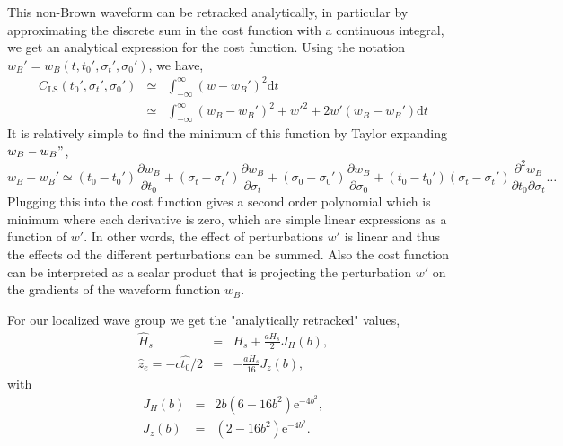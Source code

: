 This non-Brown waveform can be retracked analytically, in particular by approximating the discrete sum in the cost function with a continuous integral, we get an analytical expression for the cost function. Using the notation $w_B'=w_B(t,t_0',\sigma_t',\sigma_0')$, we have, 
\begin{eqnarray}
   C_{\mathrm{LS}}(t_0',\sigma_t',\sigma_0')& \simeq &\int_{-\infty} ^\infty \left( w-w_B'  \right)^2 \mathrm{d} t \\
                  & \simeq & \int_{-\infty} ^\infty \left( w_B-w_B' \right)^2  + w'^2+ 2 w'\left( w_B-w_B' \right)  \mathrm{d} t 
\end{eqnarray} 
It is relatively simple to find the minimum of this function \citep{DeCarlo&al.2023} by Taylor expanding $w_B-w_B"$, 
\begin{equation}
    w_B-w_B' \simeq  (t_0-t_0') \frac{\partial w_B}{\partial t_0} +   (\sigma_t-\sigma_t') \frac{\partial w_B}{\partial \sigma_t} +   (\sigma_0-\sigma_0') \frac{\partial w_B}{\partial \sigma_0} + (t_0-t_0')(\sigma_t-\sigma_t') \frac{\partial^2 w_B}{\partial t_0  \partial \sigma_t}  \dots 
\end{equation}
Plugging this into the cost function gives a second order polynomial which is minimum where each derivative is zero, 
which are simple linear expressions as a function of $w'$. In other words, the effect of perturbations $w'$ is linear and thus the effects od the different perturbations can be summed.  Also the cost function can be interpreted as a scalar product that is projecting the perturbation $w'$ on the gradients of the waveform function $w_B$. 

For our localized wave group we get the "analytically retracked" values, 
 \begin{eqnarray}
    \widehat{H}_{s}&=& H_s +  \frac{a H_s }{2}  J_H(b), \label{eq:Hsfit}\\
    \widehat{z}_e= - c \widehat{t_0} / 2 & =& - \frac{a H_s}{16} J_z(b),\label{eq:epochfit}
\end{eqnarray}
with 
 \begin{eqnarray}
    J_H(b)&=& 2 b \left(6- 16 b^2\right) \mathrm{e}^{-4b^2},\label{eq:JH}\\
    J_z(b)&=&   \left(2-16 b^2\right) \mathrm{e}^{-4 b^2}.\label{eq:Jz}
\end{eqnarray}


